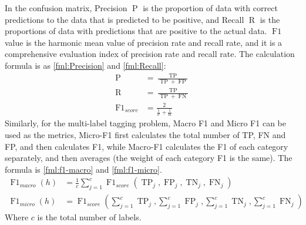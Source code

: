 In the confusion matrix, Precision \(\operatorname{P}\) is the proportion of data with correct predictions to the data that is predicted to be positive, and Recall \(\operatorname{R}\) is the proportions of data with predictions that are positive to the actual data. \(\operatorname{F1}\) value is the harmonic mean value of precision rate and recall rate, and it is a comprehensive evaluation index of precision rate and recall rate. The calculation formula is as \ref{fml:Precision} and \ref{fml:Recall}:
\begin{align}
	\operatorname{P}          & =\frac{\operatorname{TP}}{\operatorname{TP}+\operatorname{FP}} \label{fml:Precision} \\
	\operatorname{R}          & =\frac{\operatorname{TP}}{\operatorname{TP}+\operatorname{FN}} \label{fml:Recall}    \\
	\operatorname{F1}_{score} & = \frac{2}{\frac{1}{\operatorname{P}}+\frac{1}{\operatorname{R}}}
\end{align}
Similarly, for the multi-label tagging problem, Macro F1 and Micro F1 can be used as the metrics, Micro-F1 first calculates the total number of TP, FN and FP, and then calculates F1, while Macro-F1 calculates the F1 of each category separately, and then averages (the weight of each category F1 is the same). The formula is \ref{fml:f1-macro} and \ref{fml:f1-micro}.
\begin{align}
	\operatorname{F1}_{macro}(h) & =\frac{1}{c} \sum_{j=1}^{c} \operatorname{F1}_{score}(\operatorname{TP}_{j}, \operatorname{FP}_{j}, \operatorname{TN}_{j}, \operatorname{FN}_{j}) \label{fml:f1-macro}                                  \\
	\operatorname{F1}_{micro}(h) & =\operatorname{F1}_{score}(\sum_{j=1}^{c} \operatorname{TP}_{j}, \sum_{j=1}^{c} \operatorname{FP}_{j}, \sum_{j=1}^{c} \operatorname{TN}_{j}, \sum_{j=1}^{c} \operatorname{FN}_{j}) \label{fml:f1-micro}
\end{align}
Where $c$ is the total number of labels.

